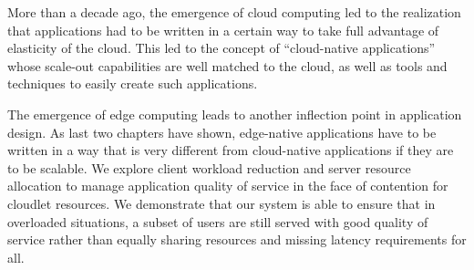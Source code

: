 More than a decade ago, the emergence of cloud computing led to the
realization that applications had to be written in a certain way to
take full advantage of elasticity of the cloud.  This led to the
concept of ``cloud-native applications'' whose scale-out capabilities
are well matched to the cloud, as well as tools and techniques to
easily create such applications.

The emergence of edge computing leads to another inflection point in application
design.  As last two chapters have shown, edge-native applications have to be
written in a way that is very different from cloud-native applications if they
are to be scalable. We explore client workload reduction and server resource
allocation to manage application quality of service in the face of contention
for cloudlet resources. We demonstrate that our system is able to ensure that in
overloaded situations, a subset of users are still served with good quality of
service rather than equally sharing resources and missing latency requirements
for all.


